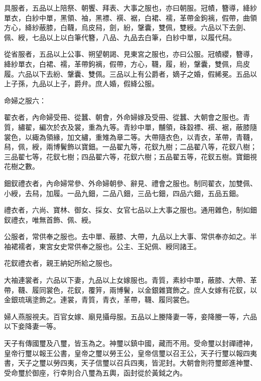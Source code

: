 \begin{pinyinscope}
 具服者，五品以上陪祭、朝饗、拜表、大事之服也，亦曰朝服。冠幘，簪導，絳紗單衣，白紗中單，黑領、袖，黑褾、襈、裾，白裙、襦，革帶金鉤褵，假帶，曲領方心，絳紗蔽膝，白韈，烏皮舄，劍，紛，鞶囊，雙佩，雙綬。六品以下去劍、佩、綬，七品以上以白筆代簪，八品、九品去白筆，白紗中單，以履代舄。



 從省服者，五品以上公事、朔望朝謁、見東宮之服也，亦曰公服。冠幘纓，簪導，絳紗單衣，白裙、襦，革帶鉤褵，假帶，方心，韈，履，紛，鞶囊，雙佩，烏皮履。六品以下去紛、鞶囊、雙佩。三品以上有公爵者，嫡子之婚，假絺冕。五品以上子孫，九品以上子，爵弁。庶人婚，假絳公服。



 命婦之服六：



 翟衣者，內命婦受冊、從蠶、朝會，外命婦嫁及受冊、從蠶、大朝會之服也。青質，繡翟，編次於衣及裳，重為九等。青紗中單，黼領，硃縠褾、襈、裾，蔽膝隨裳色，以緅為領緣，加文繡，重雉為章二等。大帶隨衣色，以青衣，革帶，青韈，舄，佩，綬，兩博鬢飾以寶鈿。一品翟九等，花釵九樹；二品翟八等，花釵八樹；三品翟七等，花釵七樹；四品翟六等，花釵六樹；五品翟五等，花釵五樹。寶鈿視花樹之數。



 鈿釵禮衣者，內命婦常參、外命婦朝參、辭見、禮會之服也。制同翟衣，加雙佩、小綬，去舄，加履。一品九鈿，二品八鈿，三品七鈿，四品六鈿，五品五鈿。



 禮衣者，六尚、寶林、御女、採女、女官七品以上大事之服也。通用雜色，制如鈿釵禮衣，唯無首飾、佩、綬。



 公服者，常供奉之服也。去中單、蔽膝、大帶，九品以上大事、常供奉亦如之。半袖裙襦者，東宮女史常供奉之服也。公主、王妃佩、綬同諸王。



 花釵禮衣者，親王納妃所給之服也。



 大袖連裳者，六品以下妻，九品以上女嫁服也。青質，素紗中單，蔽膝、大帶、革帶，韈、履同裳色，花釵，覆笄，兩博鬢，以金銀雜寶飾之。庶人女嫁有花釵，以金銀琉璃塗飾之。連裳，青質，青衣，革帶，韈、履同裳色。



 婦人燕服視夫。百官女嫁、廟見攝母服。五品以上媵降妻一等，妾降媵一等，六品以下妾降妻一等。



 天子有傳國璽及八璽，皆玉為之。神璽以鎮中國，藏而不用。受命璽以封禪禮神，皇帝行璽以報王公書，皇帝之璽以勞王公，皇帝信璽以召王公，天子行璽以報四夷書，天子之璽以勞四夷，天子信璽以召兵四夷，皆泥封。大朝會則符璽郎進神璽、受命璽於御座，行幸則合八璽為五輿，函封從於黃鉞之內。




\end{pinyinscope}
